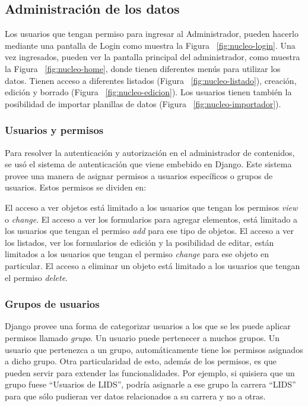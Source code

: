 \subsection{Administración de los datos}

Los usuarios que tengan permiso para ingresar al Administrador, pueden hacerlo mediante una pantalla de Login como muestra la Figura ~\ref{fig:nucleo-login}.
Una vez ingresados, pueden ver la pantalla principal del administrador, como muestra la Figura ~\ref{fig:nucleo-home}, donde tienen diferentes menús para utilizar los datos. Tienen acceso a diferentes listados (Figura ~\ref{fig:nucleo-listado}), creación, edición y borrado (Figura ~\ref{fig:nucleo-edicion}).
Los usuarios tienen también la posibilidad de importar planillas de datos (Figura ~\ref{fig:nucleo-importador}).

\subsubsection{Usuarios y permisos}

Para resolver la autenticación y autorización en el administrador de contenidos, se usó el sistema de autenticación que viene embebido en Django.
Este sistema provee una manera de asignar permisos a usuarios específicos o grupos de usuarios. Estos permisos se dividen en:
\begin{outline}
    \1 El acceso a ver objetos está limitado a los usuarios que tengan los permisos \textit{view} o \textit{change}.
    \1 El acceso a ver los formularios para agregar elementos, está limitado a los usuarios que tengan el permiso \textit{add} para ese tipo de objetos.
    \1 El acceso a ver los listados, ver los formularios de edición y la posibilidad de editar, están limitados a los usuarios que tengan el permiso \textit{change} para ese objeto en particular.
    \1 El acceso a eliminar un objeto está limitado a los usuarios que tengan el permiso \textit{delete}.
\end{outline}

\subsubsection{Grupos de usuarios}

Django provee una forma de categorizar usuarios a los que se les puede aplicar permisos llamado \textit{grupo}. Un usuario puede pertenecer a muchos grupos.
Un usuario que pertenezca a un grupo, automáticamente tiene los permisos asignados a dicho grupo.
Otra particularidad de esto, además de los permisos, es que pueden servir para extender las funcionalidades. Por ejemplo, si quisiera que un grupo fuese “Usuarios de LIDS”, podría asignarle a ese grupo la carrera “LIDS” para que sólo pudieran ver datos relacionados a su carrera y no a otras.


